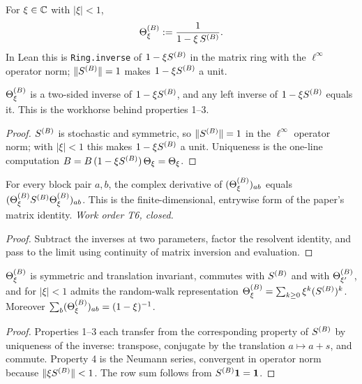 \begin{definition}\label{def:Theta}
  \leanok{}
  For $\xi\in\mathbb{C}$ with $|\xi|<1$,
  \[ \Theta^{(B)}_\xi := \frac{1}{1-\xi\,S^{(B)}}. \]
  In Lean this is \texttt{Ring.inverse} of $1-\xi S^{(B)}$ in the matrix ring with the
  $\ell^\infty$ operator norm; $\|S^{(B)}\|=1$ makes $1-\xi S^{(B)}$ a unit.
\end{definition}

\begin{lemma}\label{lem:Theta-unique}
  \leanok{}
  $\Theta^{(B)}_\xi$ is a two-sided inverse of $1-\xi S^{(B)}$, and any left inverse of
  $1-\xi S^{(B)}$ equals it.  This is the workhorse behind properties 1--3.
\end{lemma}
\begin{proof}\leanok
  $S^{(B)}$ is stochastic and symmetric, so $\|S^{(B)}\|=1$ in the $\ell^\infty$ operator
  norm; with $|\xi|<1$ this makes $1-\xi S^{(B)}$ a unit.  Uniqueness is the one-line
  computation $B=B\,(1-\xi S^{(B)})\,\Theta_\xi=\Theta_\xi$.
\end{proof}

\begin{lemma}
  \label{lem:Theta-deriv}
  \leanok
  For every block pair $a,b$, the complex derivative of
  $(\Theta^{(B)}_\xi)_{ab}$ equals $(\Theta^{(B)}_\xi S^{(B)}\Theta^{(B)}_\xi)_{ab}$.
  This is the finite-dimensional, entrywise form of the paper's matrix identity.
  \emph{Work order T6, closed.}
\end{lemma}
\begin{proof}\leanok
  Subtract the inverses at two parameters, factor the resolvent identity, and
  pass to the limit using continuity of matrix inversion and evaluation.
\end{proof}

\begin{lemma}\label{lem:propTH-1234}
  \leanok
  $\Theta^{(B)}_\xi$ is symmetric and translation invariant, commutes with $S^{(B)}$ and
  with $\Theta^{(B)}_{\xi'}$, and for $|\xi|<1$ admits the random-walk representation
  $\Theta^{(B)}_\xi=\sum_{k\ge0}\xi^k(S^{(B)})^k$.  Moreover
  $\sum_b(\Theta^{(B)}_\xi)_{ab}=(1-\xi)^{-1}$.
\end{lemma}
\begin{proof}\leanok
  Properties 1--3 each transfer from the corresponding property of $S^{(B)}$ by
  uniqueness of the inverse: transpose, conjugate by the translation
  $a\mapsto a+s$, and commute.  Property 4 is the Neumann series, convergent in
  operator norm because $\|\xi S^{(B)}\|<1$.  The row sum follows from
  $S^{(B)}\mathbf1=\mathbf1$.
\end{proof}

